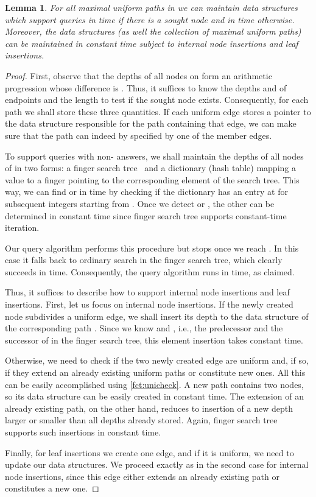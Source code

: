 \documentclass[a4paper]{article}
\newtheorem{lemma}[theorem]{Lemma}
\theoremstyle{remark}
\begin{document}
\begin{lemma}\label{lem:st}
For all maximal uniform paths  in  we can maintain data structures which support
 queries in  time if there is a sought node 
and in  time otherwise.
Moreover, the data structures (as well the collection of maximal uniform paths) can be maintained
in constant time subject to internal node insertions and leaf insertions.
\end{lemma}
\begin{proof}
First, observe that the depths of all nodes on  form an arithmetic progression whose difference is .
Thus, it suffices to know the depths  and  of endpoints and the length 
to test if the sought node exists.
Consequently, for each path  we shall store these three quantities. If each uniform edge stores a pointer to the data structure responsible for the path containing that edge, we can make sure  that the path  can indeed by specified by one of the member edges.

To support queries with non- answers, we shall maintain the depths of all nodes of  in two forms:
a finger search tree~\cite{BrodalLMTT03} and a dictionary (hash table) mapping a value to a finger pointing to the corresponding element of the search tree.
This way, we can find  or 
in  time by checking if the dictionary has an entry at  for subsequent integers  starting from .
Once we detect  or , the other can be determined in constant time since finger search tree supports
constant-time iteration.

Our query algorithm performs this procedure but stops once we reach . In this case it falls back to ordinary search
in the finger search tree, which clearly succeeds in  time.
Consequently, the query algorithm runs in  time, as claimed.

Thus, it suffices to describe how to support internal node insertions and leaf insertions.
First, let us focus on internal node insertions. If the newly created node  subdivides a uniform edge,
we shall insert its depth to the data structure of the corresponding path .
Since we know  and , i.e., the predecessor and the successor of  in the finger search tree,
this element insertion takes constant time.

Otherwise, we need to check if the two newly created edge are uniform and, if so, if they extend an already existing uniform paths
or constitute new ones. All this can be easily accomplished using \cref{fct:unicheck}.
A new path  contains two nodes, so its data structure can be easily created in constant time.
The extension of an already existing path, on the other hand, reduces to insertion of a new depth larger or smaller than
all depths already stored. Again, finger search tree supports such insertions in constant time.

Finally, for leaf insertions we create one edge, and if it is uniform, we need to update our data structures.
We proceed exactly as in the second case for internal node insertions, since this edge either extends
an already existing path or constitutes a new one.
\end{proof}
\end{document}
